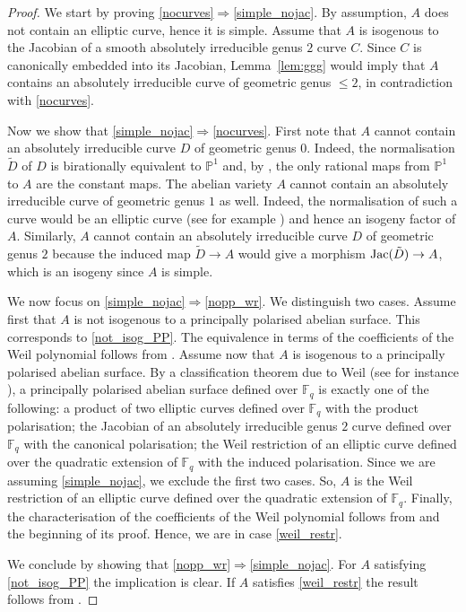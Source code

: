 \documentclass[11pt]{amsart}
\newcommand\Fq{\mathbb{F}_q}
\def\Jac{\mathop{\rm Jac}\nolimits}
\def\Jac{\mathop{\rm Jac}\nolimits}
\theoremstyle{plain}
\theoremstyle{definition}
\begin{document}
\begin{proof}
    We start by proving \ref{nocurves}$\Rightarrow$\ref{simple_nojac}. By assumption, $A$ does not contain an elliptic curve, hence it is simple. Assume that $A$ is isogenous to the Jacobian of a smooth absolutely irreducible genus $2$ curve $C$.
    Since $C$ is canonically embedded into its Jacobian, Lemma~\ref{lem:ggg} would imply that $A$ contains an absolutely irreducible curve of geometric genus $\leq 2$, in contradiction with \ref{nocurves}.

    Now we show that \ref{simple_nojac}$\Rightarrow$\ref{nocurves}.
    First note that $A$ cannot contain an absolutely irreducible curve $D$ of geometric genus $0$.
    Indeed, the normalisation $\tilde D$ of $D$ is birationally equivalent to $\mathbb{P}^1$ and, by \cite[Cor.~3.8]{CS86}, the only rational maps from $\mathbb{P}^1$ to $A$ are the constant maps.
    The abelian variety $A$ cannot contain an absolutely irreducible curve of geometric genus $1$ as well.
    Indeed, the normalisation of such a curve would be an elliptic curve (see for example \cite[Prop.~1]{Haloui17}) and hence an isogeny factor of $A$. 
    Similarly, $A$ cannot contain an absolutely irreducible curve $D$ of geometric genus $2$ because the induced map $\tilde D\to A$ would give a morphism $\Jac(\tilde D) \to A$, which is an isogeny since $A$ is simple.


    We now focus on \ref{simple_nojac}$\Rightarrow$\ref{nopp_wr}.
    We distinguish two cases.
    Assume first that $A$ is not isogenous to a principally polarised abelian surface.
    This corresponds to \ref{not_isog_PP}. 
    The equivalence in terms of the coefficients of the Weil polynomial follows from \cite[Thm.~1]{HMNR08}.
    Assume now that $A$ is isogenous to a principally polarised abelian surface.
    By a classification theorem due to Weil (see for instance \cite[Thm.~1.3]{HNR09}), a principally polarised abelian surface defined over $\Fq$ is exactly one of the following: a product of two elliptic curves defined over $\Fq$ with the product polarisation; the Jacobian of an absolutely irreducible genus $2$ curve defined over $\Fq$ with the canonical polarisation; the Weil restriction of an elliptic curve defined over the quadratic extension of $\Fq$ with the induced polarisation. 
    Since we are assuming \ref{simple_nojac}, we exclude the first two cases.
    So, $A$ is the Weil restriction of an elliptic curve defined over the quadratic extension of $\Fq$.
    Finally, the characterisation of the coefficients of the Weil polynomial follows from \cite[Prop.~4.3]{MYFE1} and the beginning of its proof.
    Hence, we are in case \ref{weil_restr}.

    We conclude by showing that \ref{nopp_wr}$\Rightarrow$\ref{simple_nojac}.
    For $A$ satisfying \ref{not_isog_PP} the implication is clear.
    If $A$ satisfies \ref{weil_restr} the result follows from \cite[Thm.~1.2-(2), Table~1.2]{HNR09}.
\end{proof}
\end{document}
